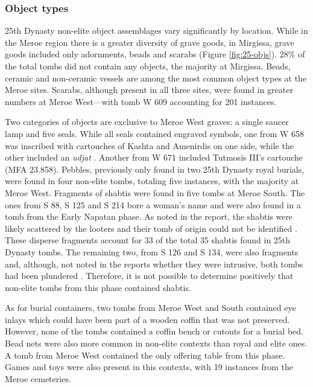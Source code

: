 \subsubsection{Object types}


25th Dynasty non-elite object assemblages vary significantly by location. While in the Meroe region there is a greater diversity of grave goods, in Mirgissa, grave goods included only adornments, beads and scarabs (Figure \ref{fig:25-objs}). 28\% of the total tombs did not contain any objects, the majority at Mirgissa. Beads, ceramic and non-ceramic vessels are among the most common object types at the Meroe sites. Scarabs, although present in all three sites, were found in greater numbers at Meroe West---with tomb W 609 accounting for 201 instances.


Two categories of objects are exclusive to Meroe West graves: a single saucer lamp and five seals. While all seals contained engraved symbols, one from W 658 was inscribed with cartouches of Kashta and Amenirdis on one side, while the other included an \textit{udjat} \parencites[p.~304]{dunhamWestSouthCemeteries1963}. Another from W 671 included Tutmosis III's cartouche (MFA 23.858). Pebbles, previously only found in two 25th Dynasty royal burials, were found in four non-elite tombs, totaling five instances, with the majority at Meroe West. Fragments of shabtis were found in five tombs at Meroe South. The ones from S 88, S 125 and S 214 bore a woman's name and were also found in a tomb from the Early Napatan phase. As noted in the report, the shabtis were likely scattered by the looters and their tomb of origin could not be identified \parencites[p.~416]{dunhamWestSouthCemeteries1963}. These disperse fragments account for 33 of the total 35 shabtis found in 25th Dynasty tombs. The remaining two, from S 126 and S 134, were also fragments and, although, not noted in the reports whether they were intrusive, both tombs had been plundered \parencites[p.~357, 429]{dunhamWestSouthCemeteries1963}. Therefore, it is not possible to determine positively that non-elite tombs from this phase contained shabtis.


As for burial containers, two tombs from Meroe West and South contained eye inlays which could have been part of a wooden coffin that was not preserved. However, none of the tombs contained a coffin bench or cutouts for a burial bed. Bead nets were also more common in non-elite contexts than royal and elite ones. A tomb from Meroe West contained the only offering table from this phase. Games and toys were also present in this contexts, with 19 instances from the Meroe cemeteries.


